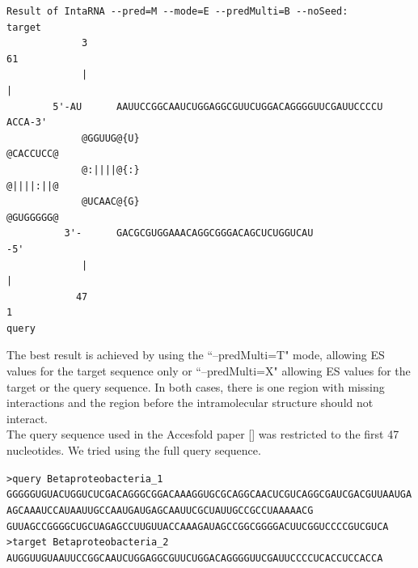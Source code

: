 \documentclass[11pt,a4paper]{report}
\begin{document}
\begin{lstlisting}[style=base]
Result of IntaRNA --pred=M --mode=E --predMulti=B --noSeed:
target
             3                                                         61
             |                                                         |
        5'-AU      AAUUCCGGCAAUCUGGAGGCGUUCUGGACAGGGGUUCGAUUCCCCU       ACCA-3'
             @GGUUG@{U}                                              @CACCUCC@
             @:||||@{:}                                              @||||:||@
             @UCAAC@{G}                                              @GUGGGGG@
          3'-      GACGCGUGGAAACAGGCGGGACAGCUCUGGUCAU                   -5'
             |                                                         |
            47                                                         1
query
\end{lstlisting}
\noindent
The best result is achieved by using the ``--predMulti=T" mode, allowing ES values for the target sequence only or ``--predMulti=X" allowing ES values for the target or the query sequence. In both cases, there is one region with missing interactions and the region before the intramolecular structure should not interact.\\
The query sequence used in the Accesfold paper [\cite{doi:10.1093/bioinformatics/btv682}] was restricted to the first 47 nucleotides. We tried using the full query sequence.\\
\begin{spacing}{0.5}
\noindent
{\tiny\texttt{>query Betaproteobacteria\_1}\\
\texttt{GGGGGUGUACUGGUCUCGACAGGGCGGACAAAGGUGCGCAGGCAACUCGUCAGGCGAUCGACGUUAAUGAAGCAAAUCCAUAAUUGCCAAUGAUGAGCAAUUCGCUAUUGCCGCCUAAAAACG
GUUAGCCGGGGCUGCUAGAGCCUUGUUACCAAAGAUAGCCGGCGGGGACUUCGGUCCCCGUCGUCA}\\
\texttt{>target Betaproteobacteria\_2}\\
\texttt{AUGGUUGUAAUUCCGGCAAUCUGGAGGCGUUCUGGACAGGGGUUCGAUUCCCCUCACCUCCACCA}\\\\}
\end{spacing}
\end{document}
